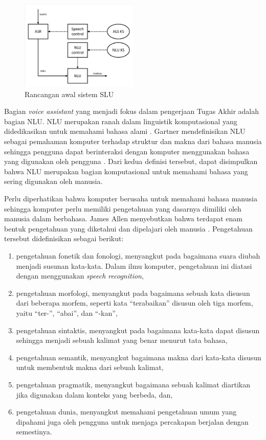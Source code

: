 \begin{figure}[H]
	\centering
	\includegraphics[width=0.5\textwidth, trim=2 2 2 2, clip]{resources/2/early_slu.pdf}
	\caption{Rancangan awal sistem SLU \parencite{tur2011spoken}}
	\label{fig:slu_early}
\end{figure}

Bagian \textit{voice assistant} yang menjadi fokus dalam pengerjaan Tugas Akhir adalah bagian NLU. NLU merupakan ranah dalam linguistik komputasional yang didedikasikan untuk memahami bahasa alami \parencite{harris2004voice}. Gartner mendefinisikan NLU sebagai pemahaman komputer terhadap struktur dan makna dari bahasa manusia sehingga pengguna dapat berinteraksi dengan komputer menggunakan bahasa yang digunakan oleh pengguna \parencite{gartnernatural}. Dari kedua definisi tersebut, dapat disimpulkan bahwa NLU merupakan bagian komputasional untuk memahami bahasa yang sering digunakan oleh manusia.

Perlu diperhatikan bahwa komputer berusaha untuk memahami bahasa manusia sehingga komputer perlu memiliki pengetahuan yang dasarnya dimiliki oleh manusia dalam berbahasa. James Allen menyebutkan bahwa terdapat enam bentuk pengetahuan yang diketahui dan dipelajari oleh manusia \parencite{allen1995natural}. Pengetahuan tersebut didefinisikan sebagai berikut:

\begin{enumerate}
	\item pengetahuan fonetik dan fonologi, menyangkut pada bagaimana suara diubah menjadi susunan kata-kata. Dalam ilmu komputer, pengetahuan ini diatasi dengan menggunakan \textit{speech recognition},
	\item pengetahuan morfologi, menyangkut pada bagaimana sebuah kata disusun dari beberapa morfem, seperti kata “terabaikan” disusun oleh tiga morfem, yaitu “ter-”, “abai”, dan “-kan”,
	\item pengetahuan sintaktis, menyangkut pada bagaimana kata-kata dapat disusun sehingga menjadi sebuah kalimat yang benar menurut tata bahasa,
	\item pengetahuan semantik, menyangkut bagaimana makna dari kata-kata disusun untuk membentuk makna dari sebuah kalimat,
	\item pengetahuan pragmatik, menyangkut bagaimana sebuah kalimat diartikan jika digunakan dalam konteks yang berbeda, dan,
	\item pengetahuan dunia, menyangkut memahami pengetahuan umum yang dipahami juga oleh pengguna untuk menjaga percakapan berjalan dengan semestinya.
\end{enumerate}

